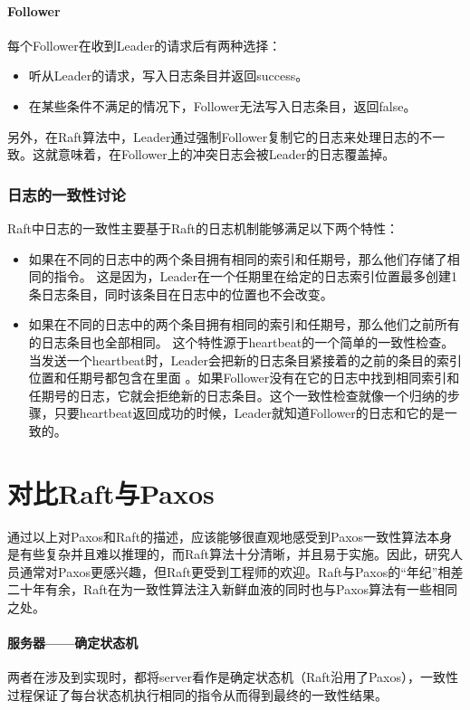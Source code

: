 \documentclass[UTF8]{article}
\begin{document}
\paragraph{Follower}

每个Follower在收到Leader的请求后有两种选择：
\begin{itemize}
	\item 听从Leader的请求，写入日志条目并返回success。
	\item 在某些条件不满足的情况下，Follower无法写入日志条目，返回false。
\end{itemize}

另外，在Raft算法中，Leader通过强制Follower复制它的日志来处理日志的不一致。这就意味着，在Follower上的冲突日志会被Leader的日志覆盖掉。

\subsubsection{日志的一致性讨论}

Raft中日志的一致性主要基于Raft的日志机制能够满足以下两个特性： 
\begin{itemize}
	\item 如果在不同的日志中的两个条目拥有相同的索引和任期号，那么他们存储了相同的指令。
	这是因为，Leader在一个任期里在给定的日志索引位置最多创建1条日志条目，同时该条目在日志中的位置也不会改变。
	\item 如果在不同的日志中的两个条目拥有相同的索引和任期号，那么他们之前所有的日志条目也全部相同。
	这个特性源于heartbeat的一个简单的一致性检查。当发送一个heartbeat时，Leader会把新的日志条目紧接着的之前的条目的索引位置和任期号都包含在里面 。如果Follower没有在它的日志中找到相同索引和任期号的日志，它就会拒绝新的日志条目。这个一致性检查就像一个归纳的步骤，只要heartbeat返回成功的时候，Leader就知道Follower的日志和它的是一致的。
\end{itemize}

\section{对比Raft与Paxos}

通过以上对Paxos和Raft的描述，应该能够很直观地感受到Paxos一致性算法本身是有些复杂并且难以推理的，而Raft算法十分清晰，并且易于实施。因此，研究人员通常对Paxos更感兴趣，但Raft更受到工程师的欢迎。Raft与Paxos的“年纪”相差二十年有余，Raft在为一致性算法注入新鲜血液的同时也与Paxos算法有一些相同之处。

\paragraph{服务器——确定状态机} 两者在涉及到实现时，都将server看作是确定状态机（Raft沿用了Paxos），一致性过程保证了每台状态机执行相同的指令从而得到最终的一致性结果。
\end{document}

